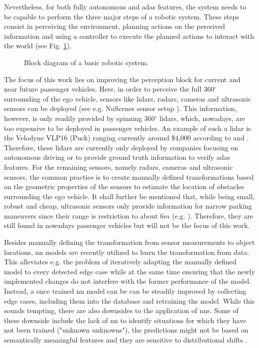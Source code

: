 Nevertheless, for both fully autonomous and \gls{adas} features, the system needs to be capable to perform the three major steps of a robotic system. These steps consist in perceiving the environment, planning actions on the perceived information and using a controller to execute the planned actions to interact with the world (see Fig. \ref{fig:basic_robot_system}).
%
\begin{figure}[H]
	\begin{center}
		\caption{\label{fig:basic_robot_system}Block diagram of a basic robotic system.}
	\end{center}
\end{figure} 
%
The focus of this work lies on improving the perception block for current and near future passenger vehicles. Here, in order to perceive the full 360$^{\circ}$ surrounding of the ego vehicle, sensors like lidars, radars, cameras and ultrasonic sensors can be deployed (see e.g. NuScenes sensor setup \cite{caesar2020nuscenes}). This information, however, is only readily provided by spinning 360$^{\circ}$ lidars, which, nowadays, are too expensive to be deployed in passenger vehicles. An example of such a lidar is the Velodyne VLP16 (Puck) ranging currently around \$4,000 according to \cite{cnet2018} and \cite{velodyne2018}. Therefore, these lidars are currently only deployed by companies focusing on autonomous driving or to provide ground truth information to verify \gls{adas} features. For the remaining sensors, namely radars, cameras and ultrasonic sensors, the common practice is to create manually defined transformations based on the geometric properties of the sensors to estimate the location of obstacles surrounding the ego vehicle. It shall further be mentioned that, while being small, robust and cheap, ultrasonic sensors only provide information for narrow parking maneuvers since their range is restriction to about 6$m$ (e.g. \cite{boschultrasonic2022}). Therefore, they are still found in nowadays passenger vehicles but will not be the focus of this work.

Besides manually defining the transformation from sensor measurements to object locations, \gls{nn} models are recently utilized to learn the transformation from data. This alleviates e.g. the problem of iteratively adapting the manually defined model to every detected edge case while at the same time ensuring that the newly implemented changes do not interfere with the former performance of the model. Instead, a once trained \gls{nn} model can be can be steadily improved by collecting edge cases, including them into the database and retraining the model. While this sounds tempting, there are also downsides to the application of \gls{nn}s. Some of these downside include the lack of \gls{nn} to identify situations for which they have not been trained ("unknown unknowns"), the predictions might not be based on semantically meaningful features and they are sensitive to distributional shifts \cite{safetyfirst2019}.

